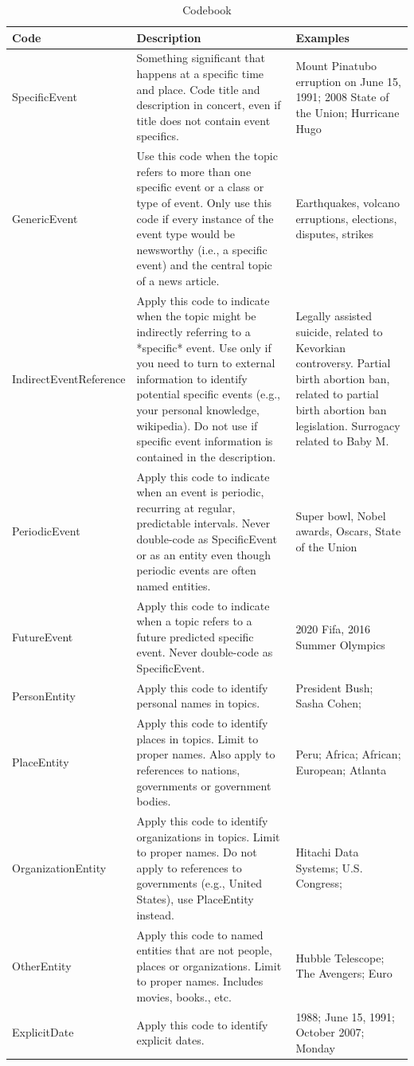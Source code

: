 \documentclass{sig-alternate}
\begin{document}
\begin{table}[H]
\small
\begin{tabular}{| l | p{7cm}  | p{7cm}  |} \hline
\bf{Code} & \bf{Description} & \bf{Examples}  \\ \hline
SpecificEvent & Something significant that happens at a specific time and place. Code title and description in concert, even if title does not contain event specifics.  & Mount Pinatubo erruption on June 15, 1991; 2008 State of the Union; Hurricane Hugo \\ \hline
GenericEvent & Use this code when the topic refers to more than one specific event or a class or type of event. Only use this code if every instance of the event type would be newsworthy (i.e., a specific event) and the central topic of a news article. & Earthquakes, volcano erruptions, elections, disputes, strikes \\ \hline
IndirectEventReference & Apply this code to indicate when the topic might be indirectly referring to a *specific* event. Use only if you need to turn to external information to identify potential specific events (e.g., your personal knowledge, wikipedia).  Do not use if specific event information is contained in the description. & Legally assisted suicide, related to Kevorkian controversy. Partial birth abortion ban, related to partial birth abortion ban legislation. Surrogacy related to Baby M. \\ \hline
PeriodicEvent & Apply this code to indicate when an event is periodic, recurring at regular, predictable intervals.  Never double-code as SpecificEvent or as an entity even though periodic events are often named entities. & Super bowl, Nobel awards, Oscars, State of the Union \\ \hline
FutureEvent & Apply this code to indicate when a topic refers to a future predicted specific event. Never double-code as SpecificEvent. & 2020 Fifa, 2016 Summer Olympics \\ \hline
PersonEntity & Apply this code to identify personal names in topics. & President Bush; Sasha Cohen;  \\ \hline
PlaceEntity & Apply this code to identify places in topics. Limit to proper names.  Also apply to references to nations, governments or government bodies. & Peru; Africa; African; European; Atlanta \\ \hline
OrganizationEntity & Apply this code to identify organizations in topics. Limit to proper names.  Do not apply to references to governments (e.g., United States), use PlaceEntity instead. & Hitachi Data Systems; U.S. Congress; \\ \hline
OtherEntity & Apply this code to named entities that are not people, places or organizations. Limit to proper names. Includes movies, books., etc. & Hubble Telescope; The Avengers; Euro	\\ \hline
ExplicitDate & Apply this code to identify explicit dates. & 1988; June 15, 1991; October 2007; Monday \\ \hline
\end{tabular}
\caption{Codebook}
\label{table.codebook}
\end{table}
\end{document}
